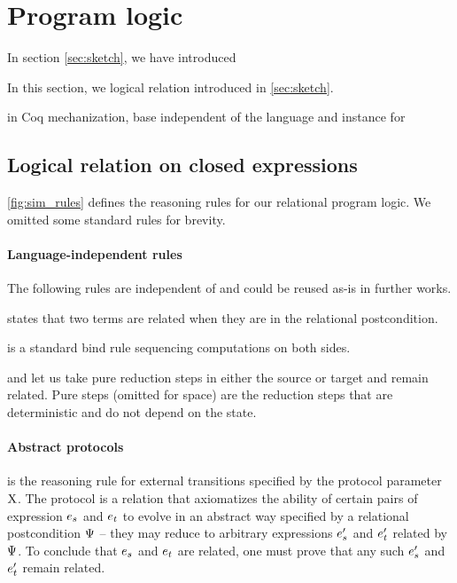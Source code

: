 \section{Program logic}

In section \cref{sec:sketch}, we have introduced

In this section, we 
logical relation introduced in \cref{sec:sketch}.

in Coq mechanization, base independent of the language and instance for \DataLang

\subsection{Logical relation on closed expressions}

\cref{fig:sim_rules} defines the reasoning rules for our relational program logic. We omitted some standard rules for brevity.

\paragraph{Language-independent rules} The following rules are
independent of \DataLang and could be reused as-is in further works.

 states that two terms are related when they are in the relational postcondition.

 is a standard bind rule sequencing computations on both sides.

 and  let us take pure reduction steps in either the source or target and remain related. Pure steps (omitted for space) are the reduction steps that are deterministic and do not depend on the state.

\paragraph{Abstract protocols}
 is the reasoning rule for external transitions specified by the protocol parameter $\mathrm{X}$. The protocol is a relation that axiomatizes the ability of certain pairs of expression $\datalangExpr_s$ and $\datalangExpr_t$ to evolve in an abstract way specified by a relational postcondition $\Psi$ -- they may reduce to arbitrary expressions $\datalangExpr_s'$ and $\datalangExpr_t'$ related by $\Psi$. To conclude that $\datalangExpr_s$ and $\datalangExpr_t$ are related, one must prove that any such $\datalangExpr_s'$ and $\datalangExpr_t'$ remain related.

